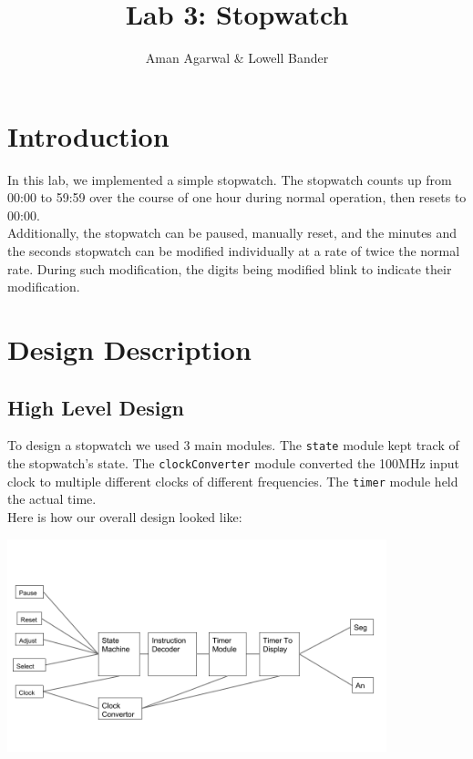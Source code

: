 \documentclass[]{article}
\newcommand{\subtitle}[1]{%
  \posttitle{%
    \par\end{center}
    \begin{center}\large#1\end{center}
    \vskip0.5em}%
}
\begin{document}
\title{Lab 3: Stopwatch}
\subtitle{CS M152A}
\author{Aman Agarwal \& Lowell Bander}

\maketitle
\tableofcontents \newpage

\section{Introduction}

In this lab, we implemented a simple stopwatch. The stopwatch counts up from 00:00 to 59:59 over the course of one hour during normal operation, then resets to 00:00. \\

Additionally, the stopwatch can be paused, manually reset, and the minutes and the seconds stopwatch can be modified individually at a rate of twice the normal rate. During such modification, the digits being modified blink to indicate their modification.

\section{Design Description}

\subsection{High Level Design}
\label{subsec:highlevel}

To design a stopwatch we used 3 main modules. The \texttt{state} module kept track of the stopwatch's state. The \texttt{clockConverter} module converted the 100MHz input clock to multiple different clocks of different frequencies. The \texttt{timer} module held the actual time.\\

Here is how our overall design looked like:

\includegraphics[width=11cm]{modularDesign.png}
\end{document}

